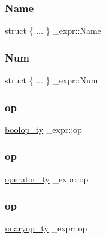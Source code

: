 \mbox{\label{struct__expr_ab99486f0b9dff19c0fe4b6f5d489b6de}} 
\subsubsection{\texorpdfstring{Name}{Name}}
{\footnotesize\ttfamily struct \{ ... \}   \+\_\+expr\+::\+Name}

\mbox{\label{struct__expr_abeecb6d096c264394285446a920bca7d}} 
\subsubsection{\texorpdfstring{Num}{Num}}
{\footnotesize\ttfamily struct \{ ... \}   \+\_\+expr\+::\+Num}

\mbox{\label{struct__expr_a14d9cfe44b98767d7ca6ae45774a9e90}} 
\subsubsection{\texorpdfstring{op}{op}\hspace{0.1cm}{\footnotesize\ttfamily [1/3]}}
{\footnotesize\ttfamily \mbox{\hyperlink{_python-ast_8h_ab7ba8d66d81017932471af1f2609a830}{boolop\+\_\+ty}} \+\_\+expr\+::op}

\mbox{\label{struct__expr_adde80ab6d2230f82c89f4c9593489ca0}} 
\subsubsection{\texorpdfstring{op}{op}\hspace{0.1cm}{\footnotesize\ttfamily [2/3]}}
{\footnotesize\ttfamily \mbox{\hyperlink{_python-ast_8h_a64ffe6085a53816a513038b9f1a04a9d}{operator\+\_\+ty}} \+\_\+expr\+::op}

\mbox{\label{struct__expr_a7483d09bf7d55490ce275f7e482744ed}} 
\subsubsection{\texorpdfstring{op}{op}\hspace{0.1cm}{\footnotesize\ttfamily [3/3]}}
{\footnotesize\ttfamily \mbox{\hyperlink{_python-ast_8h_a5a89f44a24bfbdb92d5a16b59468cffb}{unaryop\+\_\+ty}} \+\_\+expr\+::op}

